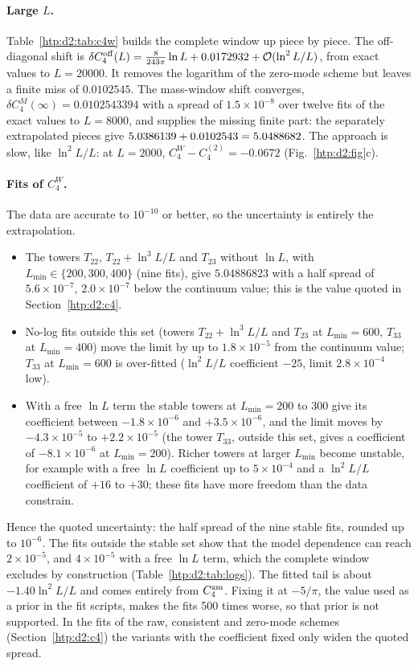 \paragraph{Large $L$.} Table~\ref{htp:d2:tab:c4w} builds the complete window up piece by piece. The off-diagonal shift is
$\delta C_4^{\rm off}(L)=\frac8{243\pi}\ln L+0.0172932+\mathcal O(\ln^2L/L)$, from exact values to $L=20000$. It removes the
logarithm of the zero-mode scheme but leaves a finite miss of $0.0102545$. The mass-window shift converges,
$\delta C_4^M(\infty)=0.0102543394$ with a spread of $1.5\times10^{-8}$ over twelve fits of the exact values to $L=8000$, and
supplies the missing finite part: the separately extrapolated pieces give $5.0386139+0.0102543=5.0488682$. The
approach is slow, like $\ln^2L/L$: at $L=2000$, $C_4^W-C_4^{(2)}=-0.0672$ (Fig.~\ref{htp:d2:fig}c).

\paragraph{Fits of $C_4^W$.} The data are accurate to $10^{-10}$ or better, so the uncertainty is entirely the extrapolation.
\begin{itemize}
\item The towers $T_{22}$, $T_{22}+\ln^3L/L$ and $T_{23}$ without $\ln L$, with $L_{\min}\in\{200,300,400\}$ (nine fits), give
 $5.04886823$ with a half spread of $5.6\times10^{-7}$, $2.0\times10^{-7}$ below the continuum value; this is the value
 quoted in Section~\ref{htp:d2:c4}.
\item No-log fits outside this set (towers $T_{22}+\ln^3L/L$ and $T_{23}$ at $L_{\min}=600$, $T_{33}$ at $L_{\min}=400$) move
 the limit by up to $1.8\times10^{-5}$ from the continuum value; $T_{33}$ at $L_{\min}=600$ is over-fitted ($\ln^2L/L$
 coefficient $-25$, limit $2.8\times10^{-4}$ low).
\item With a free $\ln L$ term the stable towers at $L_{\min}=200$ to 300 give its coefficient between $-1.8\times10^{-6}$ and
 $+3.5\times10^{-6}$, and the limit moves by $-4.3\times10^{-5}$ to $+2.2\times10^{-5}$ (the tower $T_{33}$,
 outside this set, gives a coefficient of $-8.1\times10^{-6}$ at $L_{\min}=200$). Richer towers at larger $L_{\min}$ become unstable, for example with a free $\ln L$ coefficient up to
 $5\times10^{-4}$ and a $\ln^2L/L$ coefficient of $+16$ to $+30$; these fits have more freedom than the data constrain.
\end{itemize}
Hence the quoted uncertainty: the half spread of the nine stable fits, rounded up to $10^{-6}$. The fits outside the stable
set show that the model dependence can reach $2\times10^{-5}$, and $4\times10^{-5}$ with a free $\ln L$ term, which the
complete window excludes by construction (Table~\ref{htp:d2:tab:logs}). The fitted tail is about $-1.40\ln^2L/L$ and comes entirely from $C_4^{\rm zm}$.
Fixing it at $-5/\pi$, the value used as a prior in the fit scripts, makes the fits 500 times worse, so that prior is not
supported. In the
fits of the raw, consistent and zero-mode schemes (Section~\ref{htp:d2:c4}) the variants with the coefficient fixed only widen the quoted spread.
